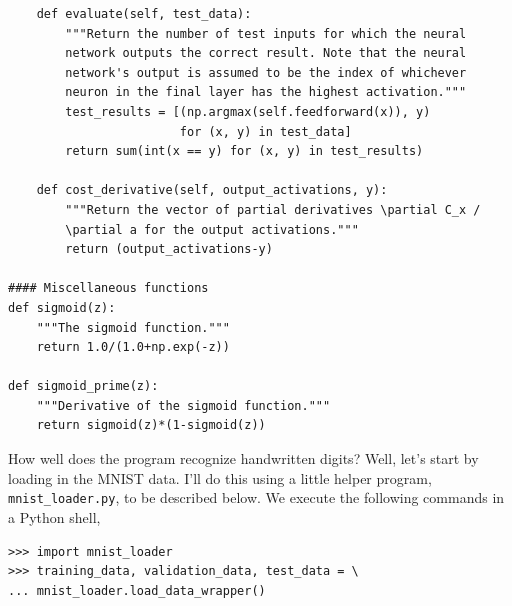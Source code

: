 \begin{verbatim}
    def evaluate(self, test_data):
        """Return the number of test inputs for which the neural
        network outputs the correct result. Note that the neural
        network's output is assumed to be the index of whichever
        neuron in the final layer has the highest activation."""
        test_results = [(np.argmax(self.feedforward(x)), y)
                        for (x, y) in test_data]
        return sum(int(x == y) for (x, y) in test_results)

    def cost_derivative(self, output_activations, y):
        """Return the vector of partial derivatives \partial C_x /
        \partial a for the output activations."""
        return (output_activations-y)

#### Miscellaneous functions
def sigmoid(z):
    """The sigmoid function."""
    return 1.0/(1.0+np.exp(-z))

def sigmoid_prime(z):
    """Derivative of the sigmoid function."""
    return sigmoid(z)*(1-sigmoid(z))
\end{verbatim}
How well does the program recognize handwritten digits? Well, let's start by loading in the MNIST data. I'll do this using a little helper program, \lstinline{mnist_loader.py}, to be described below. We execute the following commands in a Python shell,

\begin{lstlisting}
>>> import mnist_loader
>>> training_data, validation_data, test_data = \
... mnist_loader.load_data_wrapper()
\end{lstlisting}


